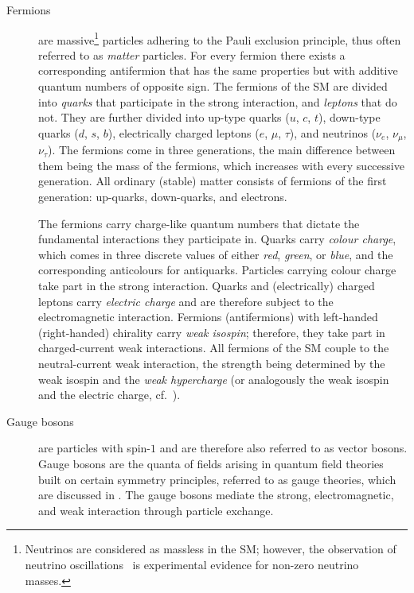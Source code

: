 \begin{description}

\item[Fermions] are massive\footnote{Neutrinos are considered as massless in the
    SM; however, the observation of neutrino
    oscillations~\cite{Super-Kamiokande:1998kpq,SNO:2002tuh} is experimental
    evidence for non-zero neutrino masses.} particles adhering to the Pauli
  exclusion principle, thus often referred to as \emph{matter} particles. For
  every fermion there exists a corresponding antifermion that has the same
  properties but with additive quantum numbers of opposite sign. The fermions of
  the SM are divided into \emph{quarks} that participate in the strong
  interaction, and \emph{leptons} that do not. They are further divided into
  up-type quarks ($u$, $c$, $t$), down-type quarks ($d$, $s$, $b$), electrically
  charged leptons ($e$, $\mu$, $\tau$), and neutrinos ($\nu_e$, $\nu_\mu$,
  $\nu_\tau$). The fermions come in three generations, the main difference
  between them being the mass of the fermions, which increases with every
  successive generation. All ordinary (stable) matter consists of fermions of
  the first generation: up-quarks, down-quarks, and electrons.

  The fermions carry charge-like quantum numbers that dictate the fundamental
  interactions they participate in. Quarks carry \emph{colour charge}, which
  comes in three discrete values of either \emph{red}, \emph{green}, or
  \emph{blue}, and the corresponding anticolours for antiquarks. Particles
  carrying colour charge take part in the strong interaction. Quarks and
  (electrically) charged leptons carry \emph{electric charge} and are therefore
  subject to the electromagnetic interaction. Fermions (antifermions) with
  left-handed (right-handed) chirality carry \emph{weak isospin}; therefore, they
  take part in charged-current weak interactions. All fermions of the SM
  couple to the neutral-current weak interaction, the strength being determined
  by the weak isospin and the \emph{weak hypercharge} (or analogously the weak
  isospin and the electric charge, cf.~).

\item[Gauge bosons] are particles with spin-$1$ and are therefore also referred
  to as vector bosons. Gauge bosons are the quanta of fields arising in quantum
  field theories built on certain symmetry principles, referred to as gauge
  theories, which are discussed in . The
  gauge bosons mediate the strong, electromagnetic, and weak interaction through
  particle exchange.


\end{description}
